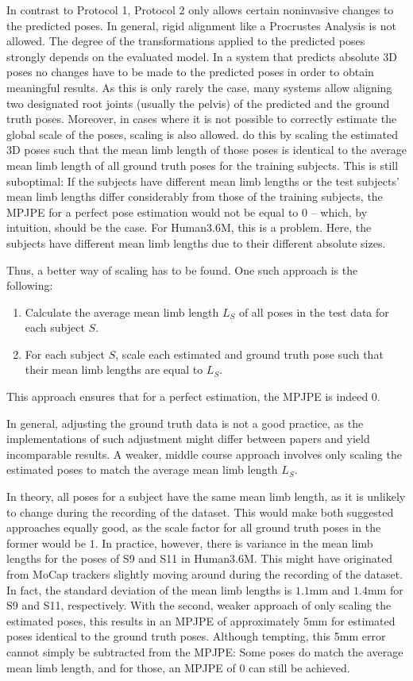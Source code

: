 In contrast to Protocol 1, Protocol 2 only allows certain noninvasive changes to the predicted poses.
In general, rigid alignment like a Procrustes Analysis is not allowed.
The degree of the transformations applied to the predicted poses strongly depends on the evaluated model.
In a system that predicts absolute 3D poses no changes have to be made to the predicted poses in order to obtain meaningful results.
As this is only rarely the case, many systems \cite{martinez17, zhou18, zhou16, tekin16, pavlakos17} allow aligning two designated root joints (usually the pelvis) of the predicted and the ground truth poses.
Moreover, in cases where it is not possible to correctly estimate the global scale of the poses, scaling is also allowed.
\citet{zhou18} do this by scaling the estimated 3D poses such that the mean limb length of those poses is identical to the average mean limb length of all ground truth poses for the training subjects.
This is still suboptimal: 
If the subjects have different mean limb lengths or the test subjects' mean limb lengths differ considerably from those of the training subjects, the MPJPE for a perfect pose estimation would not be equal to $0$ -- which, by intuition, should be the case.
For Human3.6M, this is a problem.
Here, the subjects have different mean limb lengths due to their different absolute sizes.

Thus, a better way of scaling has to be found.
One such approach is the following:
\begin{enumerate}[label={\arabic*.}]
	\item Calculate the average mean limb length $L_S$ of all poses in the test data for each subject $S$.
	\item For each subject $S$, scale each estimated and ground truth pose such that their mean limb lengths are equal to $L_S$.
\end{enumerate}
This approach ensures that for a perfect estimation, the MPJPE is indeed 0.

In general, adjusting the ground truth data is not a good practice, as the implementations of such adjustment might differ between papers and yield incomparable results.
A weaker, middle course approach involves only scaling the estimated poses to match the average mean limb length $L_S$.

In theory, all poses for a subject have the same mean limb length, as it is unlikely to change during the recording of the dataset.
This would make both suggested approaches equally good, as the scale factor for all ground truth poses in the former would be $1$.
In practice, however, there is variance in the mean limb lengths for the poses of S9 and S11 in Human3.6M.
This might have originated from MoCap trackers slightly moving around during the recording of the dataset.
In fact, the standard deviation of the mean limb lengths is $1.1$mm and $1.4$mm for S9 and S11, respectively.
With the second, weaker approach of only scaling the estimated poses, this results in an MPJPE of approximately $5$mm for estimated poses identical to the ground truth poses.
Although tempting, this 5mm error cannot simply be subtracted from the MPJPE:
Some poses do match the average mean limb length, and for those, an MPJPE of $0$ can still be achieved.

